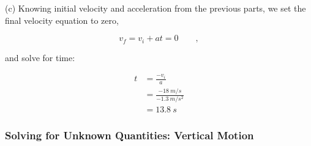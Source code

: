 \documentclass[../main-physics-problems.tex]{subfiles}
\begin{document}
\begin{questions}
\begin{solution}
    (c) Knowing initial velocity and acceleration from the previous parts, we set the final velocity equation to zero,

    \begin{equation*}
        v_f = v_i + a t = 0 \qquad ,
    \end{equation*}

    and solve for time:

    \begin{align*}
        t &= \frac{-v_i}{a} \\[1ex]
        &= \frac{-\SI{18}{m/s}}{\SI{-1.3}{m/s^2}} \\[1ex]
        &= \boxed{\SI{13.8}{s}}
    \end{align*}
\end{solution}


\end{questions}

\clearpage

\subsubsection{Solving for Unknown Quantities: Vertical Motion}
\end{document}
